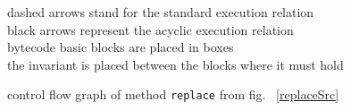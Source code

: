 \begin{figure}[p]
\begin{center}
\end{center}
dashed arrows stand for the standard execution relation \\ 
black arrows represent the acyclic execution relation \\
bytecode basic blocks are placed in boxes \\
the invariant is placed between the blocks where it must hold
\caption{control flow graph of method \texttt{replace} from fig. ~\ref{replaceSrc} }
\label{blockBC}
\end{figure}


